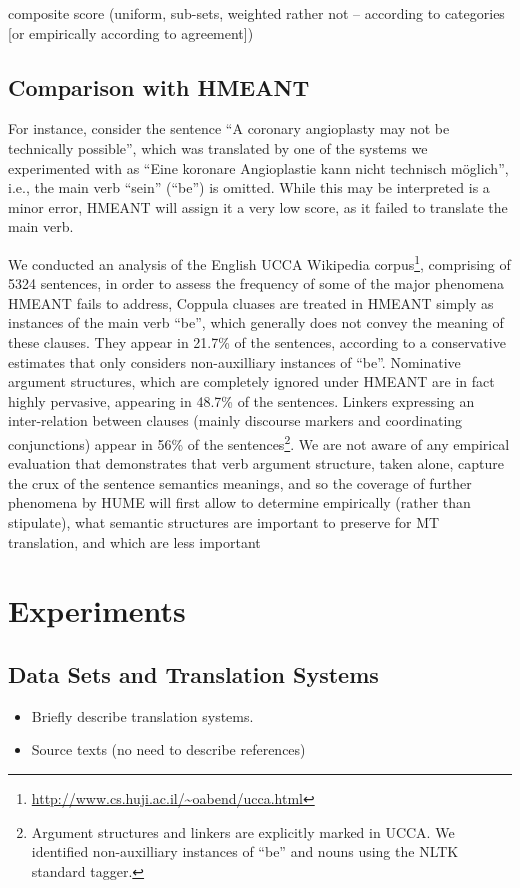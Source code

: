 \documentclass[11pt]{article}
\begin{document}
composite score (uniform, sub-sets, weighted rather not -- according to categories [or empirically according to agreement])


\subsection{Comparison with HMEANT}\label{sec:hmeant_comp}

For instance, consider the sentence ``A coronary angioplasty may not be technically possible'',
which was translated by one of the systems we experimented with as
``Eine koronare Angioplastie kann nicht technisch m{\"o}glich'', i.e., the main verb ``sein'' (``be'') is omitted.
While this may be interpreted is a minor error, HMEANT will assign it a very low score, as it failed to
translate the main verb. 

We conducted an analysis of the English UCCA Wikipedia
corpus\footnote{\url{http://www.cs.huji.ac.il/~oabend/ucca.html}}, comprising
of 5324 sentences,
in order to assess the frequency of some of the major phenomena HMEANT fails to address,
Coppula cluases are treated in HMEANT simply as instances of the main verb ``be'', which
generally does not convey the meaning of these clauses. They appear in 21.7\% of the sentences,
according to a conservative estimates that only considers non-auxilliary instances of ``be''.
Nominative argument structures, which are completely ignored under HMEANT are in fact highly
pervasive, appearing in 48.7\% of the sentences. Linkers expressing an inter-relation between
clauses (mainly discourse markers and coordinating conjunctions) appear in 56\% of the
sentences\footnote{Argument structures and linkers are explicitly marked in UCCA. We identified
  non-auxilliary instances of ``be'' and nouns using the NLTK standard tagger.}.
We are not aware of any empirical evaluation that demonstrates that verb argument structure,
taken alone, capture the crux of the sentence semantics meanings, and so the coverage of
further phenomena by HUME will first allow to determine empirically
(rather than stipulate), what semantic structures are important
to preserve for MT translation, and which are less important




\section{Experiments}\label{sec:experiments}
\subsection{Data Sets and Translation Systems}
\begin{itemize}
  \item Briefly describe translation systems.
  \item Source texts (no need to describe references)
\end{itemize}
\end{document}
